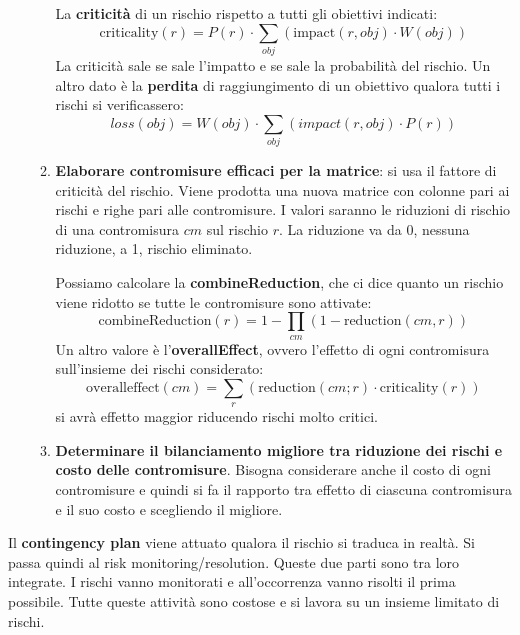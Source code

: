 \begin{enumerate}
\begin{enumerate}
                    La \textbf{criticità} di un rischio rispetto a tutti gli obiettivi indicati:
                    \begin{equation}
                        \text{criticality}(r) = P(r) \cdot \sum_{obj} (\text{impact}(r, obj) \cdot W(obj))
                    \end{equation}
                    La criticità sale se sale l'impatto e se sale la probabilità del rischio.
                    Un altro dato è la \textbf{perdita} di raggiungimento di un obiettivo
                    qualora tutti i rischi si verificassero:
                    \begin{equation}
                        loss(obj) = W(obj) \cdot \sum_{obj} (impact(r, obj) \cdot P(r))
                    \end{equation}
              \item \textbf{Elaborare contromisure efficaci per la matrice}: si usa il
                    fattore di criticità del rischio. Viene prodotta una nuova matrice con
                    colonne pari ai rischi e righe pari alle contromisure. I valori saranno
                    le riduzioni di rischio di una contromisura $cm$ sul rischio $r$. La
                    riduzione va da 0, nessuna riduzione, a 1, rischio eliminato.

                    Possiamo calcolare la \textbf{combineReduction}, che ci dice quanto un
                    rischio viene ridotto se tutte le contromisure sono attivate:
                    \begin{equation}
                        \text{combineReduction}(r) = 1 - \prod_{cm}(1 - \text{reduction}(cm, r))
                    \end{equation}
                    Un altro valore è l'\textbf{overallEffect}, ovvero l'effetto di ogni
                    contromisura sull'insieme dei rischi considerato:
                    \begin{equation}
                        \text{overalleffect}(cm) = \sum_{r} (\text{reduction}(cm; r) \cdot \text{criticality}(r))
                    \end{equation} si avrà effetto maggior riducendo rischi molto critici.
              \item \textbf{Determinare il bilanciamento migliore tra riduzione dei rischi e costo delle contromisure}.
                    Bisogna considerare anche il costo di ogni contromisure e quindi si fa il
                    rapporto tra effetto di ciascuna contromisura e il suo costo e scegliendo il migliore.
          \end{enumerate}
\end{enumerate}

Il \textbf{contingency plan} viene attuato qualora il rischio si traduca in realtà.
Si passa quindi al risk monitoring/resolution. Queste due parti sono tra loro
integrate. I rischi vanno monitorati e all'occorrenza vanno risolti il prima possibile.
Tutte queste attività sono costose e si lavora su un insieme limitato di rischi.
